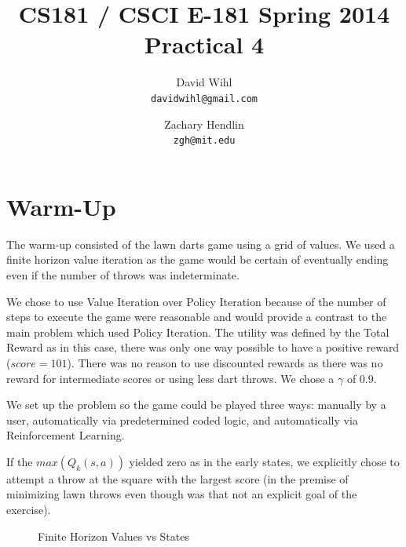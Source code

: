 \documentclass[11pt, oneside]{article}   	%
\title{CS181 / CSCI E-181 Spring 2014 Practical 4}
\author{
  David Wihl\\
  \texttt{davidwihl@gmail.com}
  \and
  Zachary Hendlin\\
  \texttt{zgh@mit.edu} 
}
\begin{document}
\maketitle
\section*{Warm-Up}

The warm-up consisted of the lawn darts game using a grid of values. We used a finite horizon value iteration as the game would be certain of eventually ending even if the number of throws was indeterminate. 

We chose to use Value Iteration over Policy Iteration because of the number of steps to execute the game were reasonable and would provide a contrast to the main problem which used Policy Iteration.  The utility was defined by the Total Reward as in this case, there was only one way possible to have a positive reward ($score=101$). There was no reason to use discounted rewards as there was no reward for intermediate scores or using less dart throws. We chose a $\gamma$ of 0.9.

We set up the problem so the game could be played three ways: manually by a user, automatically via predetermined coded logic, and automatically via Reinforcement Learning.

If the $max (Q_k(s,a))$ yielded zero as in the early states, we explicitly chose to attempt a throw at the square with the largest score (in the premise of minimizing lawn throws even though was that not an explicit goal of the exercise).

\begin{figure}[h!]
  \centering
  \caption{Finite Horizon Values vs States}
  \label{values}
 \end{figure}
\end{document}

